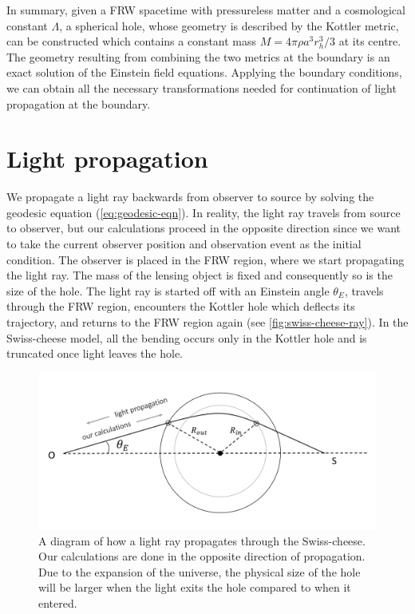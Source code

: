 In summary, given a FRW spacetime with pressureless matter and a cosmological constant $\Lambda$, a spherical hole, whose geometry is described by the Kottler metric, can be constructed which contains a constant mass $M = 4\pi \rho a^3 r_h^3/3$ at its centre. The geometry resulting from combining the two metrics at the boundary is an exact solution of the Einstein field equations. Applying the boundary conditions, we can obtain all the necessary transformations needed for continuation of light propagation at the boundary. 

\section{Light propagation}

We propagate a light ray backwards from observer to source by solving the geodesic equation (\autoref{eq:geodesic-eqn}). In reality, the light ray travels from source to observer, but our calculations proceed in the opposite direction since we want to take the current observer position and observation event as the initial condition. The observer is placed in the FRW region, where we start propagating the light ray. The mass of the lensing object is fixed and consequently so is the size of the hole. The light ray is started off with an Einstein angle $\theta_{E}$, travels through the FRW region, encounters the Kottler hole which deflects its trajectory, and returns to the FRW region again (see \autoref{fig:swiss-cheese-ray}). In the Swiss-cheese model, all the bending occurs only in the Kottler hole and is truncated once light leaves the hole. 

\begin{figure}
  \centering
  \includegraphics[height=0.4\linewidth]{images/swiss-cheese-ray2-cropped.pdf}
  \caption{A diagram of how a light ray propagates through the Swiss-cheese. Our calculations are done in the opposite direction of propagation. Due to the expansion of the universe, the physical size of the hole will be larger when the light exits the hole compared to when it entered.}
  \label{fig:swiss-cheese-ray}
\end{figure}

